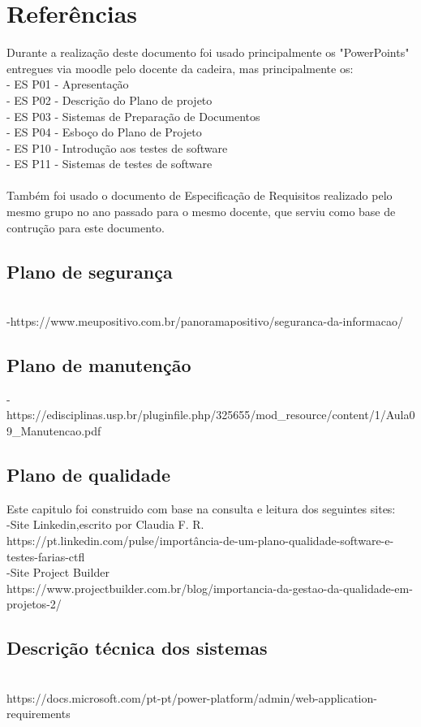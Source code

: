 \chapter{Referências}
\label{referencias}
Durante a realização deste documento foi usado principalmente os "PowerPoints" entregues via moodle pelo docente da cadeira, mas principalmente os:\\
- ES P01 - Apresentação\\
- ES P02 - Descrição do Plano de projeto\\
- ES P03 - Sistemas de Preparação de Documentos\\
- ES P04 - Esboço do Plano de Projeto\\
- ES P10 - Introdução aos testes de software\\
- ES P11 - Sistemas de testes de software\\
\\
Também foi usado o documento de Especificação de Requisitos realizado pelo mesmo grupo no ano passado para o mesmo docente, que serviu como base de contrução para este documento.\\

\section{Plano de segurança}
\\
-https://www.meupositivo.com.br/panoramapositivo/seguranca-da-informacao/ \\

\section{Plano de manutenção}
-https://edisciplinas.usp.br/pluginfile.php/325655/mod_resource/content/1/Aula09_Manutencao.pdf\\

\section{Plano de qualidade}
Este capitulo foi construido com base na consulta e leitura dos seguintes sites:\\
-Site Linkedin,escrito por Claudia F. R. \\
https://pt.linkedin.com/pulse/importância-de-um-plano-qualidade-software-e-testes-farias-ctfl \\

-Site Project Builder\\
https://www.projectbuilder.com.br/blog/importancia-da-gestao-da-qualidade-em-projetos-2/\\

\section{Descrição técnica dos sistemas}
\\
https://docs.microsoft.com/pt-pt/power-platform/admin/web-application-requirements\\
